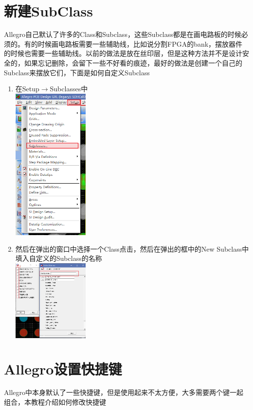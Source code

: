 \documentclass[a4paper,twoside]{article}
\begin{document}
\section{新建SubClass}
Allegro自己默认了许多的Class和Subclass，这些Subclass都是在画电路板的时候必须的。有的时候画电路板需要一些辅助线，比如说分割FPGA的bank，摆放器件的时候也需要一些辅助线。以前的做法是放在丝印层，但是这种方法并不是设计安全的，如果忘记删除，会留下一些不好看的痕迹，最好的做法是创建一个自己的Subclass来摆放它们，下面是如何自定义Subclass
\begin{enumerate}
	\item 在Setup$\rightarrow$Subclasses中 \\ \includegraphics[width=0.3\textwidth]{figures/SetupSubclass.png}
	\item 然后在弹出的窗口中选择一个Class点击，然后在弹出的框中的New Subclass中填入自定义的Subclass的名称 \\ \includegraphics[width=0.3\textwidth]{figures/NewSubclass.png}
\end{enumerate}

\section{Allegro设置快捷键}
Allegro中本身默认了一些快捷键，但是使用起来不太方便，大多需要两个键一起组合，本教程介绍如何修改快捷键
\end{document}
